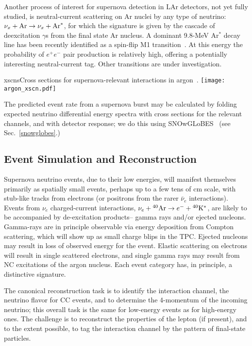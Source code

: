 Another process of interest for supernova detection in LAr detectors,
not yet fully studied,  is neutral-current  scattering on Ar nuclei by
any type of neutrino: $\nu_x + {\rm Ar} \rightarrow \nu_x + {\rm
  Ar}^*$,  for which the signature is given by the cascade of
deexcitation $\gamma$s from the final state Ar nucleus.  A dominant
9.8-MeV Ar$^*$ decay line has been recently identified as a spin-flip
M1 transition~\cite{Hayes}.   At this energy the probability of
$e^+e^-$ pair production is relatively high, offering a potentially
interesting neutral-current tag.  Other transitions are under investigation.


\begin{dunefigure}{xscns}{Cross sections for supernova-relevant interactions in argon~\cite{GilBotella:2003sz,snowglobes}.}
\texttt{[image: argon\_xscn.pdf]}
\end{dunefigure}

The predicted event rate from a supernova burst may be calculated by
folding expected neutrino differential energy spectra with cross
sections for the relevant channels, and with detector response; we do
this using SNOwGLoBES~\cite{snowglobes} (see Sec.~\ref{snowglobes}.)


\subsection{Event Simulation and Reconstruction}

Supernova neutrino events, due to their low energies, will manifest
themselves primarily as spatially small events, perhaps up to a few tens of cm
scale, with stub-like tracks from
electrons (or positrons from the rarer $\bar{\nu}_e$ interactions).
Events from $\nu_e $ charged-current interactions, $\nu_e+{}^{40}{\rm
  Ar}\rightarrow e^{-}+{}^{40}{\rm K}^{*}$, are likely to be
accompanied by de-excitation products-- gamma rays and/or ejected
nucleons. Gamma-rays are in principle observable via energy deposition
from Compton scattering, which will show up as small charge blips in
the TPC.  
Ejected nucleons may result in loss of observed energy for
the event.  Elastic scattering on electrons will result in single
scattered electrons, and single gamma rays may result from NC
excitations of the argon nucleus.   Each event category has, in principle, a
distinctive signature.

The canonical reconstruction task is to identify the interaction
channel, the neutrino flavor for CC events, and to determine the
4-momentum of the incoming neutrino; this overall task is the same for
low-energy events as for high-energy ones.  The challenge is to
reconstruct the properties of the lepton (if present), and to the extent
possible, to tag the interaction channel by the pattern of final-state
particles.

